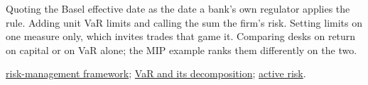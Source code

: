\begin{qfmethod}
 Quoting the Basel effective date as the date a bank's own regulator applies the rule. Adding unit VaR limits and calling the sum the firm's risk. Setting limits on one measure only, which invites trades that game it. Comparing desks on return on capital or on VaR alone; the MIP example ranks them differently on the two.

 \hyperref[def:risk-management-framework]{risk-management framework}; \hyperref[meth:portfolio-var-methods-decomposition]{VaR and its decomposition}; \hyperref[meth:active-risk-decomposition]{active risk}.

\end{qfmethod}
